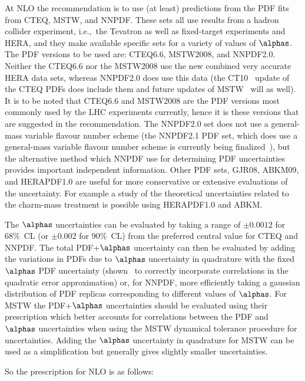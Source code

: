 At NLO the recommendation is to use (at least) 
predictions from the PDF fits from CTEQ, MSTW, and
NNPDF. These sets all use results from a hadron collider experiment, i.e.,\ the
Tevatron as well as fixed-target experiments and HERA,
and they make available specific sets for a
variety of values of $\alphas$. The PDF versions to be used are: CTEQ6.6,
MSTW2008, and NNPDF2.0. Neither the CTEQ6.6 nor the MSTW2008 
use the new combined very accurate HERA data sets, whereas NNPDF2.0 does
use this data (the CT10~\cite{Lai:2010vv}   update of 
the CTEQ PDFs does include them and future updates of MSTW~\cite{Thorne:2010kj} will
as well). It is to be noted 
that CTEQ6.6 and MSTW2008 are the PDF versions most commonly used by the LHC
experiments currently, hence it is these
versions that are suggested in the recommendation.
 The NNPDF2.0 set does not use a general-mass variable flavour
number scheme (the NNPDF2.1 PDF set, which does use a general-mass
variable flavour number scheme is currently being
finalized~\cite{Rojo:2010gv}), but the
alternative method which NNPDF use for determining PDF uncertainties
provides important independent information.  
Other PDF sets, GJR08, ABKM09, and HERAPDF1.0 are useful for more 
conservative or extensive evaluations of the uncertainty.  
For example a study of the 
theoretical uncertainties related to the charm-mass treatment is possible 
using HERAPDF1.0 and ABKM. 

The  $\alphas$ uncertainties can be evaluated by
taking a range of $\pm 0.0012$ for $68\%$~CL (or $\pm 0.002$ for $90\%$~CL) from the preferred central value for CTEQ and NNPDF. The total
PDF+$\alphas$ uncertainty can then be evaluated by adding the
variations in PDFs due to $\alphas$ uncertainty in quadrature with
the fixed $\alphas$ PDF uncertainty (shown~\cite{Lai:2010nw} 
to correctly incorporate
correlations in the quadratic error approximation) or, for NNPDF,
more efficiently taking a gaussian distribution of PDF replicas
corresponding to different values of $\alphas$. 
For MSTW the PDF+$\alphas$ uncertainties should be evaluated using
their prescription which better accounts for correlations between the
PDF and $\alphas$ uncertainties when using the MSTW dynamical
tolerance procedure for uncertainties. Adding the $\alphas$
uncertainty in quadrature for MSTW can be used as a simplification but
generally gives slightly smaller uncertainties.  

So the prescription for NLO is as follows:


